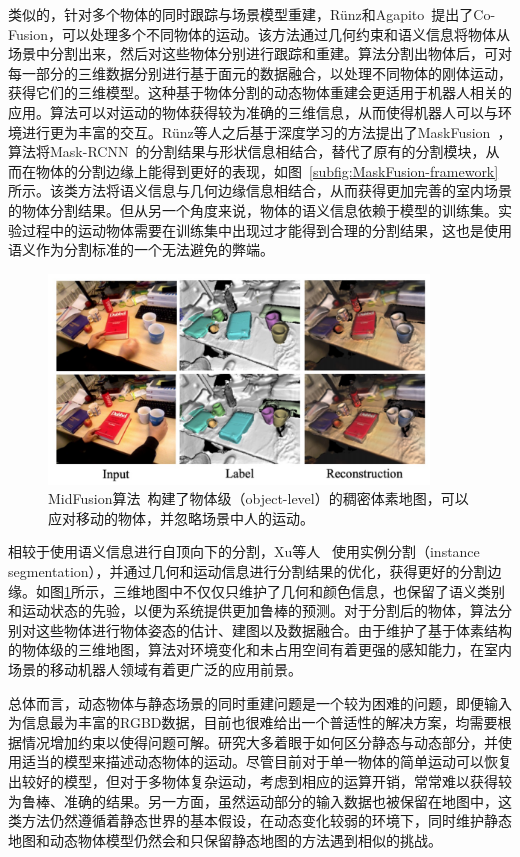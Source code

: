 类似的，针对多个物体的同时跟踪与场景模型重建，R\"unz和Agapito~\cite{2017CoFusion}提出了Co-Fusion，可以处理多个不同物体的运动。该方法通过几何约束和语义信息将物体从场景中分割出来，然后对这些物体分别进行跟踪和重建。算法分割出物体后，可对每一部分的三维数据分别进行基于面元的数据融合，以处理不同物体的刚体运动，获得它们的三维模型。这种基于物体分割的动态物体重建会更适用于机器人相关的应用。算法可以对运动的物体获得较为准确的三维信息，从而使得机器人可以与环境进行更为丰富的交互。R\"unz等人之后基于深度学习的方法提出了MaskFusion~\cite{2018MaskFusion}，算法将Mask-RCNN~\cite{2017MaskRCNN}的分割结果与形状信息相结合，替代了原有的分割模块，从而在物体的分割边缘上能得到更好的表现，如图~\ref{subfig:MaskFusion-framework}所示。该类方法将语义信息与几何边缘信息相结合，从而获得更加完善的室内场景的物体分割结果。但从另一个角度来说，物体的语义信息依赖于模型的训练集。实验过程中的运动物体需要在训练集中出现过才能得到合理的分割结果，这也是使用语义作为分割标准的一个无法避免的弊端。

\begin{figure}[thbp]
	\centering
	\includegraphics[width=0.9\textwidth]{figs/2-2/midFusion.jpeg} 
	\caption{MidFusion算法~\cite{2019MIDFusion}构建了物体级（object-level）的稠密体素地图，可以应对移动的物体，并忽略场景中人的运动。}
	\label{fig:midFusion}
\end{figure}

相较于使用语义信息进行自顶向下的分割，Xu等人 ~\cite{2019MIDFusion}使用实例分割（instance segmentation），并通过几何和运动信息进行分割结果的优化，获得更好的分割边缘。如图\ref{fig:midFusion}所示，三维地图中不仅仅只维护了几何和颜色信息，也保留了语义类别和运动状态的先验，以便为系统提供更加鲁棒的预测。对于分割后的物体，算法分别对这些物体进行物体姿态的估计、建图以及数据融合。由于维护了基于体素结构的物体级的三维地图，算法对环境变化和未占用空间有着更强的感知能力，在室内场景的移动机器人领域有着更广泛的应用前景。

总体而言，动态物体与静态场景的同时重建问题是一个较为困难的问题，即便输入为信息最为丰富的RGBD数据，目前也很难给出一个普适性的解决方案，均需要根据情况增加约束以使得问题可解。研究大多着眼于如何区分静态与动态部分，并使用适当的模型来描述动态物体的运动。尽管目前对于单一物体的简单运动可以恢复出较好的模型，但对于多物体复杂运动，考虑到相应的运算开销，常常难以获得较为鲁棒、准确的结果。另一方面，虽然运动部分的输入数据也被保留在地图中，这类方法仍然遵循着静态世界的基本假设，在动态变化较弱的环境下，同时维护静态地图和动态物体模型仍然会和只保留静态地图的方法遇到相似的挑战。

